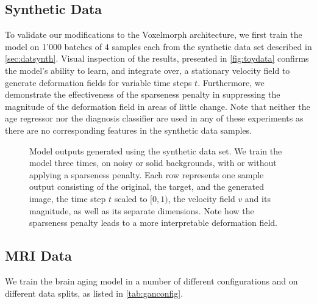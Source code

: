 \subsection{Synthetic Data}
To validate our modifications to the Voxelmorph architecture, we first train the model on 1'000 batches of 4 samples each from the synthetic data set described in \autoref{sec:datsynth}. Visual inspection of the results, presented in \autoref{fig:toydata} confirms the model's ability to learn, and integrate over, a stationary velocity field to generate deformation fields for variable time steps $t$. Furthermore, we demonstrate the effectiveness of the sparseness penalty in suppressing the magnitude of the deformation field in areas of little change. Note that neither the age regressor nor the diagnosis classifier are used in any of these experiments as there are no corresponding features in the synthetic data samples.

\begin{figure}
	\centering
	
	\vspace*{-15pt}
	\caption{Model outputs generated using the synthetic data set. We train the model three times, on noisy or solid backgrounds, with or without applying a sparseness penalty. Each row represents one sample output consisting of the original, the target, and the generated image, the time step $t$ scaled to $[0, 1)$, the velocity field $v$ and its magnitude, as well as its separate dimensions. Note how the sparseness penalty leads to a more interpretable deformation field.}
	\label{fig:toydata}
\end{figure}

\subsection{MRI Data}

We train the brain aging model in a number of different configurations and on different data splits, as listed in \autoref{tab:ganconfig}.

